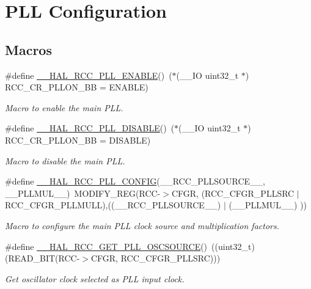 \hypertarget{group___r_c_c___p_l_l___configuration}{}\section{P\+LL Configuration}
\label{group___r_c_c___p_l_l___configuration}
\subsection*{Macros}
\begin{DoxyCompactItemize}
\item 
\#define \hyperlink{group___r_c_c___p_l_l___configuration_gaaf196a2df41b0bcbc32745c2b218e696}{\+\_\+\+\_\+\+H\+A\+L\+\_\+\+R\+C\+C\+\_\+\+P\+L\+L\+\_\+\+E\+N\+A\+B\+LE}()~($\ast$(\+\_\+\+\_\+\+IO uint32\+\_\+t $\ast$) R\+C\+C\+\_\+\+C\+R\+\_\+\+P\+L\+L\+O\+N\+\_\+\+BB = E\+N\+A\+B\+LE)
\begin{DoxyCompactList}\small\item\em Macro to enable the main P\+LL. \end{DoxyCompactList}\item 
\#define \hyperlink{group___r_c_c___p_l_l___configuration_ga718a6afcb1492cc2796be78445a7d5ab}{\+\_\+\+\_\+\+H\+A\+L\+\_\+\+R\+C\+C\+\_\+\+P\+L\+L\+\_\+\+D\+I\+S\+A\+B\+LE}()~($\ast$(\+\_\+\+\_\+\+IO uint32\+\_\+t $\ast$) R\+C\+C\+\_\+\+C\+R\+\_\+\+P\+L\+L\+O\+N\+\_\+\+BB = D\+I\+S\+A\+B\+LE)
\begin{DoxyCompactList}\small\item\em Macro to disable the main P\+LL. \end{DoxyCompactList}\item 
\#define \hyperlink{group___r_c_c___p_l_l___configuration_gadff34131a73367bbf345984ea5fdecca}{\+\_\+\+\_\+\+H\+A\+L\+\_\+\+R\+C\+C\+\_\+\+P\+L\+L\+\_\+\+C\+O\+N\+F\+IG}(\+\_\+\+\_\+\+R\+C\+C\+\_\+\+P\+L\+L\+S\+O\+U\+R\+C\+E\+\_\+\+\_\+,  \+\_\+\+\_\+\+P\+L\+L\+M\+U\+L\+\_\+\+\_\+)~M\+O\+D\+I\+F\+Y\+\_\+\+R\+EG(R\+CC-\/$>$C\+F\+GR, (R\+C\+C\+\_\+\+C\+F\+G\+R\+\_\+\+P\+L\+L\+S\+RC $\vert$ R\+C\+C\+\_\+\+C\+F\+G\+R\+\_\+\+P\+L\+L\+M\+U\+LL),((\+\_\+\+\_\+\+R\+C\+C\+\_\+\+P\+L\+L\+S\+O\+U\+R\+C\+E\+\_\+\+\_\+) $\vert$ (\+\_\+\+\_\+\+P\+L\+L\+M\+U\+L\+\_\+\+\_\+) ))
\begin{DoxyCompactList}\small\item\em Macro to configure the main P\+LL clock source and multiplication factors. \end{DoxyCompactList}\item 
\#define \hyperlink{group___r_c_c___p_l_l___configuration_ga3ea1390f8124e2b3b8d53e95541d6e53}{\+\_\+\+\_\+\+H\+A\+L\+\_\+\+R\+C\+C\+\_\+\+G\+E\+T\+\_\+\+P\+L\+L\+\_\+\+O\+S\+C\+S\+O\+U\+R\+CE}()~((uint32\+\_\+t)(R\+E\+A\+D\+\_\+\+B\+IT(R\+CC-\/$>$C\+F\+GR, R\+C\+C\+\_\+\+C\+F\+G\+R\+\_\+\+P\+L\+L\+S\+RC)))
\begin{DoxyCompactList}\small\item\em Get oscillator clock selected as P\+LL input clock. \end{DoxyCompactList}\end{DoxyCompactItemize}


